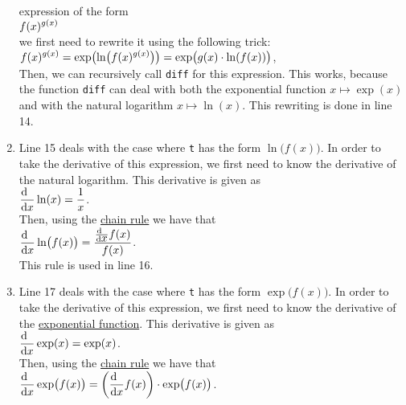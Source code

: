 \begin{enumerate}
      expression of the form
      \\[0.2cm]
      \hspace*{1.3cm}
      $\displaystyle f(x)^{g(x)}$
      \\[0.2cm]
      we first need to rewrite it using the following trick:
      \\[0.2cm]
      \hspace*{1.3cm}
      $\displaystyle f(x)^{g(x)} = \exp\bigl(\ln\bigl(f(x)^{g(x)}\bigr)\bigr) = \exp\bigl(g(x) \cdot \ln(f(x))\bigr)$,
      \\[0.2cm]
      Then, we can recursively call \texttt{diff} for this expression.  This works, because the function
      \texttt{diff} can deal with both the exponential function $x \mapsto \exp(x)$ and with the natural
      logarithm $x \mapsto \ln(x)$.  This rewriting is done in line 14.
\item Line 15 deals with the case where \texttt{t} has the form $\ln\bigl(f(x)\bigr)$.  
      In order to take the derivative of this expression, we first need to know the derivative of the natural
      logarithm.  This derivative is given as 
      \\[0.2cm]
      \hspace*{1.3cm}
      $\displaystyle \frac{\textrm{d}\;\;}{\textrm{d}\mbox{$x$}} \ln(x) = \frac{1}{x}$.
      \\[0.2cm]
      Then, using the \href{https://en.wikipedia.org/wiki/Chain_rule}{chain rule} we have that
      \\[0.2cm]
      \hspace*{1.3cm}
      $\displaystyle \frac{\textrm{d}\;\;}{\textrm{d}\mbox{$x$}} \ln\bigl(f(x)\bigr) = \frac{\frac{\textrm{d}\;\;}{\textrm{d}\mbox{$x$}} f(x)}{f(x)}$.
      \\[0.2cm]
      This rule is used in line 16.
\item Line 17 deals with the case where \texttt{t} has the form $\exp\bigl(f(x)\bigr)$.  
      In order to take the derivative of this expression, we first need to know the derivative of the 
      \href{https://en.wikipedia.org/wiki/Exponential_function}{exponential function}.  This derivative is given as 
      \\[0.2cm]
      \hspace*{1.3cm}
      $\displaystyle \frac{\textrm{d}\;\;}{\textrm{d}\mbox{$x$}} \exp(x) = \exp(x)$.
      \\[0.2cm]
      Then, using the \href{https://en.wikipedia.org/wiki/Chain_rule}{chain rule} we have that
      \\[0.2cm]
      \hspace*{1.3cm}
      $\displaystyle \frac{\textrm{d}\;\;}{\textrm{d}\mbox{$x$}} \exp\bigl(f(x)\bigr) = \left(\frac{\textrm{d}\;\;}{\textrm{d}\mbox{$x$}} f(x)\right) \cdot \exp\bigl(f(x)\bigr)$.
      \\[0.2cm]

\end{enumerate}

